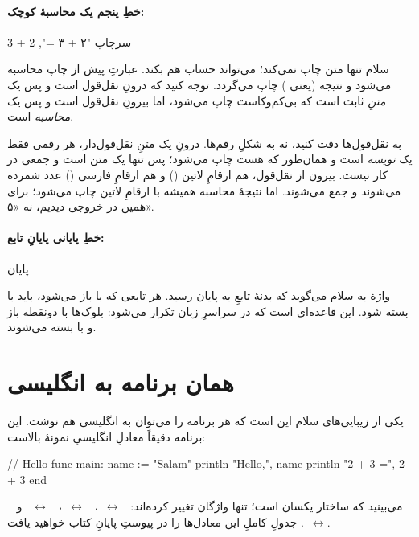 \paragraph{خطِ پنجم یک محاسبهٔ کوچک:}
\begin{salamfa}
    سرچاپ "۲ + ۳ =", 2 + 3
\end{salamfa}
سلام تنها متن چاپ نمی‌کند؛ می‌تواند حساب هم بکند. عبارتِ  پیش از
چاپ محاسبه می‌شود و نتیجه (یعنی ) چاپ می‌گردد. توجه کنید که
 درونِ نقل‌قول است و پس یک \emph{متنِ} ثابت است که بی‌کم‌وکاست
چاپ می‌شود، اما  بیرونِ نقل‌قول است و پس یک \emph{محاسبه} است.

\begin{warn}
به نقل‌قول‌ها دقت کنید، نه به شکلِ رقم‌ها. درونِ یک متنِ نقل‌قول‌دار، هر رقمی
فقط یک \emph{نویسه} است و همان‌طور که هست چاپ می‌شود؛ پس  تنها یک
متن است و جمعی در کار نیست. بیرون از نقل‌قول، هم ارقامِ لاتین () و
هم ارقامِ فارسی () عدد شمرده می‌شوند و جمع می‌شوند. اما نتیجهٔ
محاسبه همیشه با ارقامِ لاتین چاپ می‌شود؛ برای همین در خروجی  دیدیم، نه
«۵».
\end{warn}

\paragraph{خطِ پایانی پایانِ تابع:}
\begin{salamfa}
پایان
\end{salamfa}
واژهٔ  به سلام می‌گوید که بدنهٔ تابعِ  به پایان رسید.
هر تابعی که با \code{:} باز می‌شود، باید با  بسته شود. این قاعده‌ای
است که در سراسرِ زبان تکرار می‌شود: بلوک‌ها با دونقطه باز و با 
بسته می‌شوند.

\section{همان برنامه به انگلیسی}

یکی از زیبایی‌های سلام این است که هر برنامه را می‌توان به انگلیسی هم نوشت.
این برنامه دقیقاً معادلِ انگلیسیِ نمونهٔ بالاست:

\begin{salamen}
// Hello
func main:
    name := "Salam"
    println "Hello,", name
    println "2 + 3 =", 2 + 3
end
\end{salamen}

می‌بینید که ساختار یکسان است؛ تنها واژگان تغییر کرده‌اند:
~$\leftrightarrow$~،
~$\leftrightarrow$~،
~$\leftrightarrow$~ و
~$\leftrightarrow$~. جدولِ کاملِ این معادل‌ها را در
پیوستِ پایانِ کتاب خواهید یافت.

